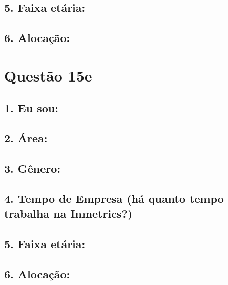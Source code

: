 \documentclass[]{book}
\begin{document}
\hypertarget{faixa-etaria-26}{%
\subsection{5. Faixa etária:}\label{faixa-etaria-26}}

\hypertarget{alocacao-26}{%
\subsection{6. Alocação:}\label{alocacao-26}}

\hypertarget{questao-15e}{%
\section{Questão 15e}\label{questao-15e}}

\hypertarget{eu-sou-27}{%
\subsection{1. Eu sou:}\label{eu-sou-27}}

\hypertarget{area-27}{%
\subsection{2. Área:}\label{area-27}}

\hypertarget{genero-27}{%
\subsection{3. Gênero:}\label{genero-27}}

\hypertarget{tempo-de-empresa-ha-quanto-tempo-trabalha-na-inmetrics-27}{%
\subsection{4. Tempo de Empresa (há quanto tempo trabalha na Inmetrics?)}\label{tempo-de-empresa-ha-quanto-tempo-trabalha-na-inmetrics-27}}

\hypertarget{faixa-etaria-27}{%
\subsection{5. Faixa etária:}\label{faixa-etaria-27}}

\hypertarget{alocacao-27}{%
\subsection{6. Alocação:}\label{alocacao-27}}
\end{document}

